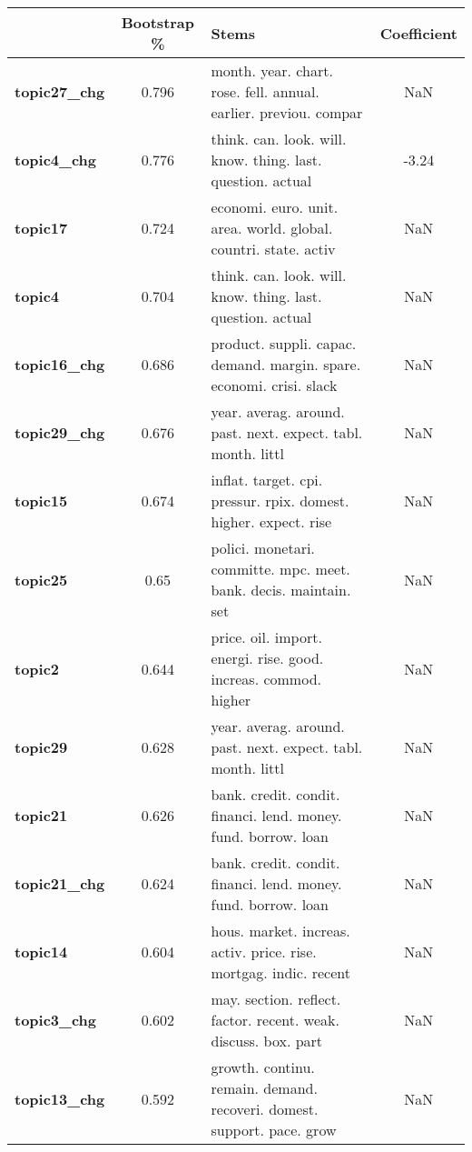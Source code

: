 \begin{tabular}{|l|c|l|c|}
\toprule
{} & Bootstrap \% &                                                                   Stems &  Coefficient \\
\midrule
\textbf{topic27\_chg} &  0.796 &  month. year. chart. rose. fell. annual. earlier. previou. compar & NaN \\
\textbf{topic4\_chg } &  0.776 &  think. can. look. will. know. thing. last. question. actual & -3.24 \\
\textbf{topic17    } &  0.724 &  economi. euro. unit. area. world. global. countri. state. activ & NaN \\
\textbf{topic4     } &  0.704 &  think. can. look. will. know. thing. last. question. actual & NaN \\
\textbf{topic16\_chg} &  0.686 &  product. suppli. capac. demand. margin. spare. economi. crisi. slack & NaN \\
\textbf{topic29\_chg} &  0.676 &  year. averag. around. past. next. expect. tabl. month. littl & NaN \\
\textbf{topic15    } &  0.674 &  inflat. target. cpi. pressur. rpix. domest. higher. expect. rise & NaN \\
\textbf{topic25    } &  0.65 &  polici. monetari. committe. mpc. meet. bank. decis. maintain. set & NaN \\
\textbf{topic2     } &  0.644 &  price. oil. import. energi. rise. good. increas. commod. higher & NaN \\
\textbf{topic29    } &  0.628 &  year. averag. around. past. next. expect. tabl. month. littl & NaN \\
\textbf{topic21    } &  0.626 &  bank. credit. condit. financi. lend. money. fund. borrow. loan & NaN \\
\textbf{topic21\_chg} &  0.624 &  bank. credit. condit. financi. lend. money. fund. borrow. loan & NaN \\
\textbf{topic14    } &  0.604 &  hous. market. increas. activ. price. rise. mortgag. indic. recent & NaN \\
\textbf{topic3\_chg } &  0.602 &  may. section. reflect. factor. recent. weak. discuss. box. part & NaN \\
\textbf{topic13\_chg} &  0.592 &  growth. continu. remain. demand. recoveri. domest. support. pace. grow & NaN \\
\bottomrule
\end{tabular}
